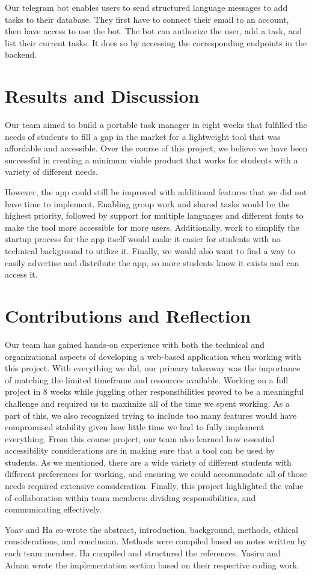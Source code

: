 \documentclass[11pt,oneside]{article}
\begin{document}
Our telegram bot enables users to send structured language messages to add tasks to their database. They first have to connect their email to an account, then have access to use the bot. The bot can authorize the user, add a task, and list their current tasks. It does so by accessing the corresponding endpoints in the backend.

\section{Results and Discussion}
Our team aimed to build a portable task manager in eight weeks that fulfilled the needs of students to fill a gap in the market for a lightweight tool that was affordable and accessible. Over the course of this project, we believe we have been successful in creating a minimum viable product that works for students with a variety of different needs.

However, the app could still be improved with additional features that we did not have time to implement. Enabling group work and shared tasks would be the highest priority, followed by support for multiple languages and different fonts to make the tool more accessible for more users. Additionally, work to simplify the startup process for the app itself would make it easier for students with no technical background to utilize it. Finally, we would also want to find a way to easily advertise and distribute the app, so more students know it exists and can access it.


\section{Contributions and Reflection}
Our team has gained hands-on experience with both the technical and organizational aspects of developing a web-based application when working with this project. With everything we did, our primary takeaway was the importance of matching the limited timeframe and resources available. Working on a full project in 8 weeks while juggling other responsibilities proved to be a meaningful challenge and required us to maximize all of the time we spent working. As a part of this, we also recognized trying to include too many features would have compromised stability given how little time we had to fully implement everything. From this course project, our team also learned how essential accessibility considerations are in making sure that a tool can be used by students. As we mentioned, there are a wide variety of different students with different preferences for working, and ensuring we could accommodate all of those needs required extensive consideration. Finally, this project highlighted the value of collaboration within team members: dividing responsibilities, and communicating effectively. 

Yoav and Ha co-wrote the abstract, introduction, background, methods, ethical considerations, and conclusion. Methods were compiled based on notes written by each team member. Ha compiled and structured the references. Yasiru and Adnan wrote the implementation section based on their respective coding work.




\end{document}
